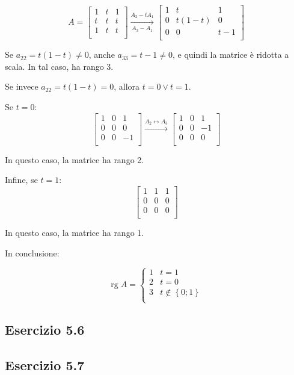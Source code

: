 \documentclass{article}
\DeclareMathOperator{\rg}{rg}  %
\begin{document}
\[A = \begin{bmatrix}
    1 & t & 1 \\
    t & t & t \\
    1 & t & t \\
\end{bmatrix}
\overset{A_2-tA_1}{\underset{A_3-A_1}{\longrightarrow}}
\begin{bmatrix}
    1 & t & 1 \\
    0 & t(1-t) & 0 \\
    0 & 0 & t-1 \\
\end{bmatrix}
\]

Se $a_{22} = t(1-t) \ne 0$, anche $a_{33} = t-1 \ne 0$,
e quindi la matrice è ridotta a scala. In tal caso, ha rango 3.

Se invece $a_{22} = t(1-t) = 0$, allora $t=0\vee t=1$.

Se $t=0$:
\[\begin{bmatrix}
    1 & 0 & 1 \\
    0 & 0 & 0 \\
    0 & 0 & -1 \\
\end{bmatrix}
\overset{A_2\leftrightarrow A_3}{\longrightarrow}
\begin{bmatrix}
    1 & 0 & 1 \\
    0 & 0 & -1 \\
    0 & 0 & 0 \\
\end{bmatrix}\]

In questo caso, la matrice ha rango 2.

Infine, se $t = 1$:
\[\begin{bmatrix}
    1 & 1 & 1 \\
    0 & 0 & 0 \\
    0 & 0 & 0 \\
\end{bmatrix}\]

In questo caso, la matrice ha rango 1.

In conclusione:

\[\rg{A} = \begin{cases}
    1 & t = 1 \\
    2 & t = 0 \\
    3 & t \notin \left\{ 0; 1 \right\} \\
\end{cases}\]



\subsection*{Esercizio 5.6}


\subsection*{Esercizio 5.7}
\end{document}

